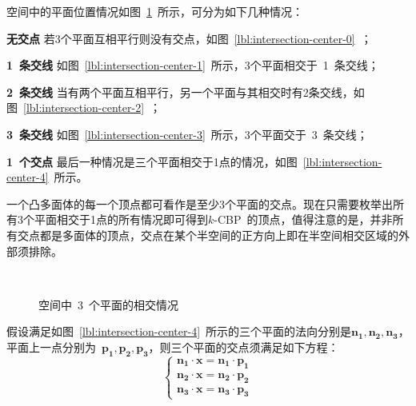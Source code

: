 空间中的平面位置情况如图~\ref{fig:three-planes-intersection}~所示，可分为如下几种情况：
\begin{inparaenum}[(1)]
\item \textbf{无交点} 若3个平面互相平行则没有交点，如图~\ref{lbl:intersection-center-0}~；
\item \textbf{1~条交线} 如图~\ref{lbl:intersection-center-1}~所示，3个平面相交于~1~条交线；
\item \textbf{2~条交线} 当有两个平面互相平行，另一个平面与其相交时有2条交线，如图~\ref{lbl:intersection-center-2}~；
\item \textbf{3~条交线} 如图~\ref{lbl:intersection-center-3}~所示，3个平面交于~3~条交线；
\item \textbf{1~个交点} 最后一种情况是三个平面相交于1点的情况，如图~\ref{lbl:intersection-center-4}~所示。
\end{inparaenum}

一个凸多面体的每一个顶点都可看作是至少3个平面的交点。现在只需要枚举出所有3个平面相交于1点的所有情况即可得到$k$-CBP~的顶点，值得注意的是，并非所有交点都是多面体的顶点，交点在某个半空间的正方向上即在半空间相交区域的外部须排除。

\begin{figure}[htbp]
  \centering
  \hspace{1em}%
  \hspace{1em}%
  \\
  \caption{空间中~3~个平面的相交情况}
  \label{fig:three-planes-intersection}
\end{figure}

假设满足如图~\ref{lbl:intersection-center-4}~所示的三个平面的法向分别是$\bm{n_1}, \bm{n_2}, \bm{n_3}$，
平面上一点分别为~$\bm{p_1}, \bm{p_2}, \bm{p_3}$，则三个平面的交点须满足如下方程： 
\begin{equation}
  \label{equa:three-planes-intersection}
  \left\{
    \begin{array}{l}
      \bm{n_1} \cdot \bm{x} = \bm{n_1} \cdot \bm{p_1}\\
      \bm{n_2} \cdot \bm{x} = \bm{n_2} \cdot \bm{p_2}\\
      \bm{n_3} \cdot \bm{x} = \bm{n_3} \cdot \bm{p_3}
    \end{array}
    \right.
\end{equation}

